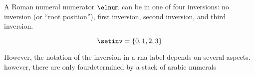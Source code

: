 
A Roman numeral numerator $\elnum$ can be in one of four
inversions: no inversion (or ``root position''), first
inversion, second inversion, and third inversion.

\begin{equation}
    \label{eq:inversion_vocabulary}
    \setinv = \{ 0, 1, 2, 3 \}
\end{equation}


However, the notation of the inversion in a \gls{rna} label
depends on several aspects. however, there are only
fourdetermined by a stack of arabic numerals


        
